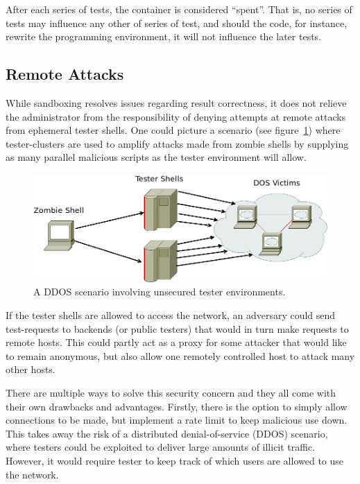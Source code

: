 After each series of tests, the container is considered ``spent''. That is, no series of tests may influence any other of series of test, and should the code, for instance, rewrite the programming environment, it will not influence the later tests.

\subsection{Remote Attacks}%
While sandboxing resolves issues regarding result correctness, it does not relieve the administrator from the responsibility of denying attempts at remote attacks from ephemeral tester shells. One could picture a scenario (see figure~\ref{fig:tester-ddos}) where tester-clusters are used to amplify attacks made from zombie shells by supplying as many parallel malicious scripts as the tester environment will allow.
\begin{figure}[ht]
    \centering
    \includegraphics[width=\textwidth]{img/tester_amplification.png}
    \caption{A DDOS scenario involving unsecured tester environments.}\label{fig:tester-ddos}
\end{figure}
If the tester shells are allowed to access the network, an adversary could send test-requests to backends (or public testers) that would in turn make requests to remote hosts. This could partly act as a proxy for some attacker that would like to remain anonymous, but also allow one remotely controlled host to attack many other hosts.

There are multiple ways to solve this security concern and they all come with their own drawbacks and advantages. Firstly, there is the option to simply allow connections to be made, but implement a rate limit to keep malicious use down. This takes away the risk of a distributed denial-of-service (DDOS) scenario, where testers could be exploited to deliver large amounts of illicit traffic. However, it would require tester to keep track of which users are allowed to use the network.

